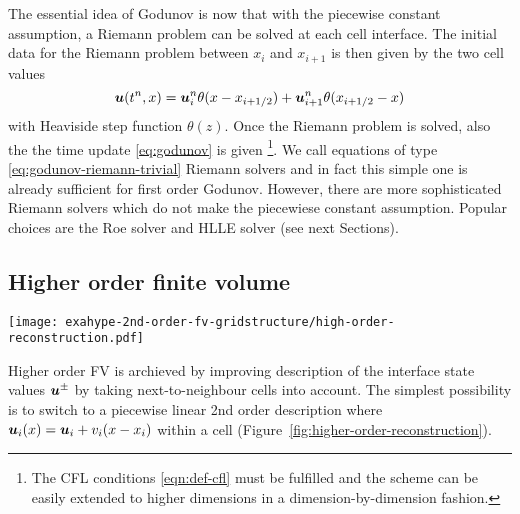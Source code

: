 The essential idea of Godunov is now that with the piecewise constant assumption,
a Riemann problem can be solved at each cell interface. The initial data for the
Riemann problem between $x_{i}$ and $x_{i+1}$ is then given by the two cell values
\begin{equation}\label{eq:godunov-riemann-interface}
\boldsymbol{u}(t^n,x) = \boldsymbol{u}^n_i \theta(x-x_{i+1/2}) + \boldsymbol{u}^n_{i+1} \theta(x_{i+1/2}-x)
\end{equation}
with Heaviside step function $\theta(z)$.
Once the Riemann problem is solved, also
the the time update \eqref{eq:godunov} is given
\footnote{
 The CFL conditions \eqref{eqn:def-cfl} must be fulfilled and the scheme can be
 easily extended to higher dimensions in a dimension-by-dimension fashion.
}. We call equations of type
\eqref{eq:godunov-riemann-trivial} Riemann solvers and in fact this simple one
is already sufficient for first order Godunov. However, there are more sophisticated
Riemann solvers which do not make the piecewiese constant assumption. 
Popular choices are the Roe solver and HLLE solver (see next Sections).

\subsection{Higher order finite volume}
\begin{marginfigure}
	\centering
	\texttt{[image: exahype-2nd-order-fv-gridstructure/high-order-reconstruction.pdf]}
	\caption[FV Higher order reconstruction, Cartoon drawn with Inkscape, 
	\exclusive]%
	{Cartoon which demonstrates how higher order reconstruction of the field
	 works: While a first order reconstruction method assumes cells to have
	 an average value (cells in this one-dimensional example are non-uniformly
	 sized), in a second order reconstruction (think of a Taylor expansion in
	 each cell, with a linear term) the field is approximated by taking
	 neighbouring cells into account. In general, requirements such as a
	 continuity condition do not neccessarily have to be fulfilled, while
     they typically are desirable in schemes.
     }
	\label{fig:higher-order-reconstruction}
\end{marginfigure}
Higher order FV is archieved by improving description of the interface
state values $\boldsymbol{u}^{\pm}$ by taking next-to-neighbour cells into account. 
The simplest
possibility is to switch to a piecewise linear 2nd order description
where $\boldsymbol{u}_i(x) = \boldsymbol{u}_i + v_i(x-x_i)$ within a cell 
(Figure~\ref{fig:higher-order-reconstruction}).

